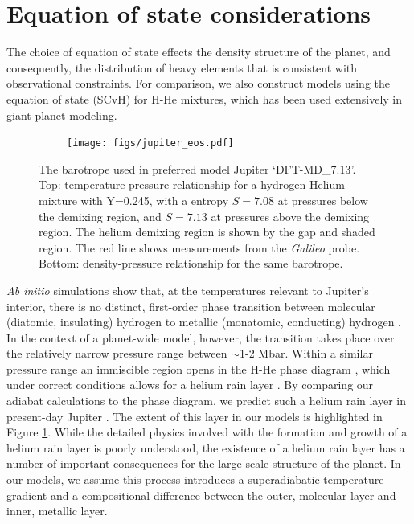 \section{Equation of state considerations}
The choice of equation of state effects the density structure of the planet, and
consequently, the distribution of heavy elements that is consistent with observational
constraints. For comparison, we also construct models using the \citet{saumon1995}
equation of state (SCvH) for H-He mixtures, which has been used extensively in giant planet
modeling. 

\begin{figure}[h!]  
  \centering
    \texttt{[image: figs/jupiter\_eos.pdf]}
\caption{ The barotrope used in preferred model Jupiter `DFT-MD\_7.13'. Top:
    temperature-pressure relationship for a hydrogen-Helium mixture with Y=0.245,
    with a entropy $S=7.08$ at pressures below the demixing region, and $S=7.13$ at
    pressures above the demixing region. The helium demixing region is shown by the
    gap and shaded region. The red line shows measurements from the \textit{Galileo}
probe. Bottom: density-pressure relationship for the same barotrope.}
\label{fig:eos}
\end{figure}

\textit{Ab initio} simulations show that, at the temperatures relevant to Jupiter's
interior, there is no distinct, first-order phase transition between molecular
(diatomic, insulating) hydrogen to metallic (monatomic, conducting) hydrogen
\citep{vorberger2007}. In the context of a planet-wide model, however, the transition
takes place over the relatively narrow pressure range between $\sim$1-2 Mbar. Within
a similar pressure range an immiscible region opens in the H-He phase diagram
\cite{morales2013}, which under correct conditions allows for a helium rain layer
\cite{stevenson1977a,stevenson1977b}. By comparing our adiabat calculations to the
\cite{morales2013} phase diagram, we predict such a helium rain layer in present-day
Jupiter \citep{hubbard2016}. The extent of this layer in our models is highlighted in
Figure \ref{fig:eos}. While the detailed physics involved with the formation and
growth of a helium rain layer is poorly understood, the existence of a helium rain
layer has a number of important consequences for the large-scale structure of the
planet. In our models, we assume this process introduces a superadiabatic temperature
gradient and a compositional difference between the outer, molecular layer and inner,
metallic layer.


